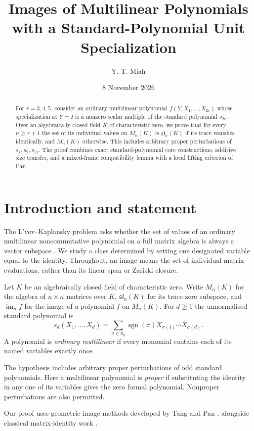 \documentclass[11pt,reqno]{amsart}
\title[Multilinear images with a standard-polynomial specialization]{Images of Multilinear Polynomials with a Standard-Polynomial Unit Specialization}
\author{Y. T. Miah}
\date{8 November 2026}
\newcommand{\im}{\operatorname{im}}
\theoremstyle{plain}
\theoremstyle{definition}
\numberwithin{equation}{section}
\begin{document}
\begin{abstract}
For $r=3,4,5$, consider an ordinary multilinear polynomial
$f(Y,X_1,\ldots,X_{2r})$ whose specialization at $Y=I$ is a nonzero
scalar multiple of the standard polynomial $s_{2r}$.  Over an
algebraically closed field $K$ of characteristic zero, we prove that
for every $n\ge r+1$ the set of its individual values on $M_n(K)$ is
$\mathfrak{sl}_n(K)$ if its trace vanishes identically, and $M_n(K)$
otherwise.  This includes arbitrary proper perturbations of
$s_7,s_9,s_{11}$.  The proof combines exact standard-polynomial core
constructions, additive size transfer, and a mixed-frame compatibility
lemma with a local lifting criterion of Pan.
\end{abstract}
\maketitle

\section{Introduction and statement}
The L'vov--Kaplansky problem asks whether the set of values of an
ordinary multilinear noncommutative polynomial on a full matrix
algebra is always a vector subspace \cite{KBRY2020}.  We study a
class determined by setting one designated variable equal to the
identity.  Throughout, an image means the set of individual
matrix evaluations, rather than its linear span or Zariski closure.

Let $K$ be an algebraically closed field of characteristic zero.
Write $M_n(K)$ for the algebra of $n\times n$ matrices over $K$,
$\mathfrak{sl}_n(K)$ for its trace-zero subspace, and $\im_n f$
for the image of a polynomial $f$ on $M_n(K)$.  For $d\ge1$ the
unnormalised standard polynomial is
\begin{equation}\label{eq:std}
 s_d(X_1,\ldots,X_d)=\sum_{\sigma\in S_d}\operatorname{sgn}(\sigma)X_{\sigma(1)}\cdots X_{\sigma(d)}.
\end{equation}
A polynomial is \emph{ordinary multilinear} if every monomial
contains each of its named variables exactly once.

The hypothesis includes arbitrary proper perturbations of odd standard
polynomials.  Here a multilinear polynomial is \emph{proper} if
substituting the identity in any one of its variables gives the zero
formal polynomial.  Nonproper perturbations are also permitted.

Our proof uses geometric image methods developed by Tang
\cite[Lemmas~2--3]{Tang2026} and Pan
\cite[\S9.3, Corollary~9.7]{Pan2026}, alongside classical
matrix-identity work \cite{AL1950,Leron1973,Rowen1974,Serre2016}.
\end{document}

